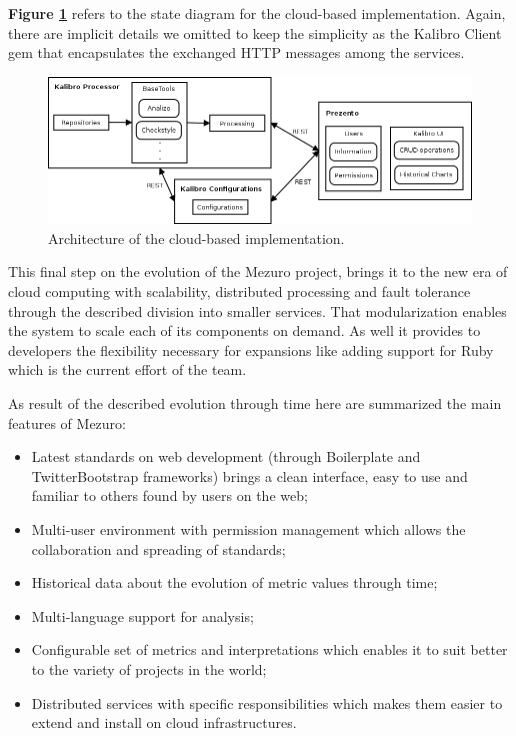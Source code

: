 \textbf{Figure \ref{fig:mezuro-cloud-arch}} refers to the state diagram for the cloud-based implementation. Again, there are implicit details we omitted to keep the simplicity as the Kalibro Client gem that encapsulates the exchanged HTTP messages among the services.

\begin{figure}[htb]
  \centering
  \includegraphics[width=\textwidth]{images/mezuro-cloud-arch.png}
  \caption{Architecture of the cloud-based implementation.}
  \label{fig:mezuro-cloud-arch}
\end{figure}

This final step on the evolution of the Mezuro project, brings it to the new era of cloud computing with scalability, distributed processing and fault tolerance through the described division into smaller services. That modularization enables the system to scale each of its components on demand. As well it provides to developers the flexibility necessary for expansions like adding support for Ruby which is the current effort of the team.

As result of the described evolution through time here are summarized the main features of Mezuro:

\begin{itemize}
  \item Latest standards on web development (through Boilerplate and TwitterBootstrap frameworks) brings a clean interface, easy to use and familiar to others found by users on the web;
  \item Multi-user environment with permission management which allows the collaboration and spreading of standards;
  \item Historical data about the evolution of metric values through time;
  \item Multi-language support for analysis;
  \item Configurable set of metrics and interpretations which enables it to suit better to the variety of projects in the world;
  \item Distributed services with specific responsibilities which makes them easier to extend and install on cloud infrastructures.
\end{itemize}
